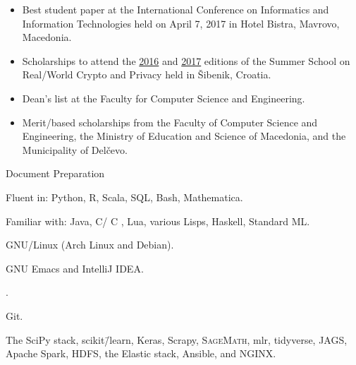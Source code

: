 \documentclass[version=last, paper=A4, DIV=12, toc=bibliography]{scrartcl}%
\newcommand*{\CC}{%
  C\nolinebreak%
  \hspace{-.05em}\raisebox{.3ex}{\relsize{-2}{\textbf{+}}}\nolinebreak%
  \hspace{-.10em}\raisebox{.3ex}{\relsize{-2}{\textbf{+}}}%
}%
\begin{document}
\begin{itemize}
\item Best student paper at the  International Conference on Informatics
  and Information Technologies held on April 7, 2017 in Hotel Bistra,
  Mavrovo, Macedonia.
\item Scholarships to attend the
  \href{http://summerschool-croatia.cs.ru.nl/2016/}{2016} and
  \href{http://summerschool-croatia.cs.ru.nl/2017/}{2017} editions of the Summer
  School on Real\-/World Crypto and Privacy held in Šibenik, Croatia.
\item Dean's list at the \textsf{Faculty for Computer Science and Engineering}.
\item Merit\-/based scholarships from the \textsf{Faculty of Computer Science
    and Engineering}, the \textsf{Ministry of Education and Science of
    Macedonia}, and the \textsf{Municipality of Delčevo}.
\end{itemize}


\begingroup
{}
\begin{labeling}[~--]{Document Preparation}
\item[Programming] Fluent in: Python, R, Scala, SQL, Bash,
  Mathematica\textsuperscript{\textregistered}.

  Familiar with: Java, C/\CC, Lua, various Lisps, Haskell, Standard ML.
\item[Operating Systems] GNU/Linux (Arch Linux and Debian).
\item[Text Editors/IDEs] GNU Emacs and IntelliJ IDEA\@.
\item[Document Preparation] .
\item[Version Control] Git.
\item[Miscellaneous] The SciPy stack, scikit\=/learn, Keras, Scrapy,
  \textsc{SageMath}, mlr, tidyverse, JAGS, Apache Spark, HDFS, the Elastic
  stack, Ansible, and NGINX\@.
\end{labeling}
\endgroup

\printbibliography[title=Publications]
\end{document}
